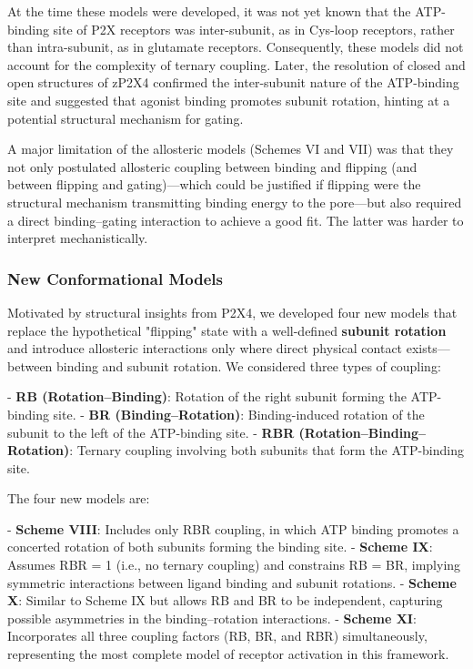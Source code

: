 \documentclass[pdflatex,sn-nature]{sn-jnl}%
\theoremstyle{thmstyleone}%
\theoremstyle{thmstyletwo}%
\theoremstyle{thmstylethree}%
\begin{document}
At the time these models were developed, it was not yet known that the ATP-binding site of P2X receptors was inter-subunit, as in Cys-loop receptors, rather than intra-subunit, as in glutamate receptors. Consequently, these models did not account for the complexity of ternary coupling. Later, the resolution of closed and open structures of zP2X4 \cite{cerrada_p2x, abierta_p2x} confirmed the inter-subunit nature of the ATP-binding site and suggested that agonist binding promotes subunit rotation, hinting at a potential structural mechanism for gating.

A major limitation of the allosteric models (Schemes VI and VII) was that they not only postulated allosteric coupling between binding and flipping (and between flipping and gating)—which could be justified if flipping were the structural mechanism transmitting binding energy to the pore—but also required a direct binding–gating interaction to achieve a good fit. The latter was harder to interpret mechanistically. 

\subsubsection{New Conformational Models}

Motivated by structural insights from P2X4, we developed four new models that replace the hypothetical "flipping" state with a well-defined \textbf{subunit rotation} and introduce allosteric interactions only where direct physical contact exists—between binding and subunit rotation. We considered three types of coupling:

- \textbf{RB (Rotation–Binding)}: Rotation of the right subunit forming the ATP-binding site.  
- \textbf{BR (Binding–Rotation)}: Binding-induced rotation of the subunit to the left of the ATP-binding site.  
- \textbf{RBR (Rotation–Binding–Rotation)}: Ternary coupling involving both subunits that form the ATP-binding site.  

The four new models are:

- \textbf{Scheme VIII}: Includes only RBR coupling, in which ATP binding promotes a concerted rotation of both subunits forming the binding site.  
- \textbf{Scheme IX}: Assumes RBR = 1 (i.e., no ternary coupling) and constrains RB = BR, implying symmetric interactions between ligand binding and subunit rotations.  
- \textbf{Scheme X}: Similar to Scheme IX but allows RB and BR to be independent, capturing possible asymmetries in the binding–rotation interactions.  
- \textbf{Scheme XI}: Incorporates all three coupling factors (RB, BR, and RBR) simultaneously, representing the most complete model of receptor activation in this framework.  
\end{document}
